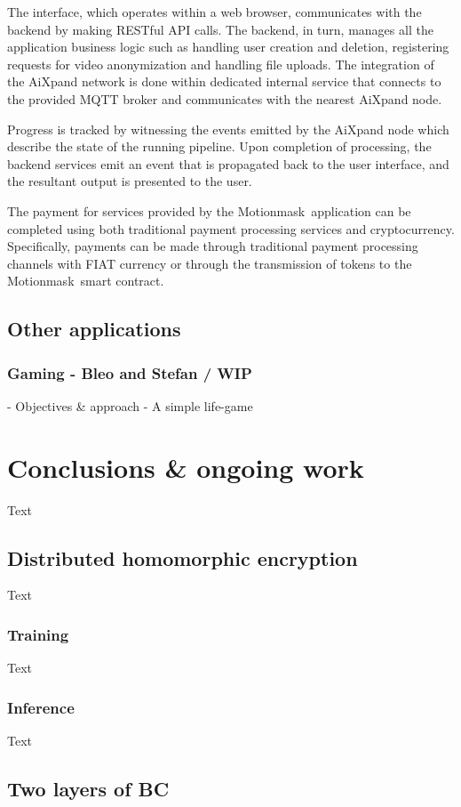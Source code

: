 \documentclass{article}
\begin{document}
The interface, which operates within a web browser, communicates with the backend by making RESTful API calls. The backend, in turn, manages all the application business logic such as handling user creation and deletion, registering requests for video anonymization and handling file uploads. The integration of the AiXpand network is done within dedicated internal service that connects to the provided MQTT broker and communicates with the nearest AiXpand node. 

Progress is tracked by witnessing the events emitted by the AiXpand node which describe the state of the running pipeline. Upon completion of processing, the backend services emit an event that is propagated back to the user interface, and the resultant output is presented to the user.

The payment for services provided by the Motionmask\texttrademark\ application can be completed using both traditional payment processing services and cryptocurrency. Specifically, payments can be made through traditional payment processing channels with FIAT currency or through the transmission of tokens to the Motionmask\texttrademark\ smart contract.


\subsection{Other applications}
\subsubsection{Gaming - Bleo and Stefan / WIP}
 - Objectives \& approach
 - A simple life-game


\section{Conclusions \& ongoing work}
Text
\subsection{Distributed homomorphic encryption}
Text
\subsubsection{Training}
Text
\subsubsection{Inference}
Text

\subsection{Two layers of BC}
\end{document}

